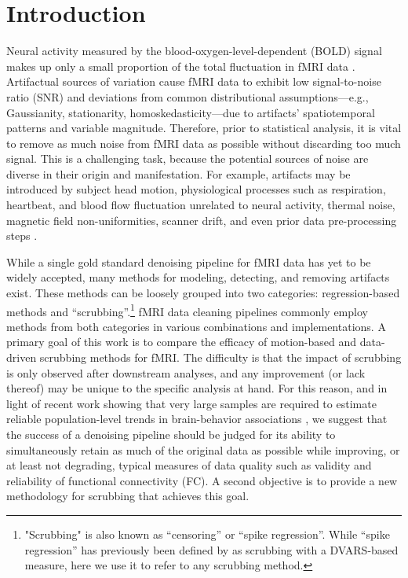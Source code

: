 \documentclass{article}
\begin{document}

\section{Introduction}

Neural activity measured by the blood-oxygen-level-dependent (BOLD) signal makes up only a small proportion of the total fluctuation in fMRI data \citep{lindquistStatisticalAnalysisFMRI2008,bianciardiSourcesFunctionalMagnetic2009}. Artifactual sources of variation cause fMRI data to exhibit low signal-to-noise ratio (SNR) and deviations from common distributional assumptions---e.g., Gaussianity, stationarity, homoskedasticity---due to artifacts' spatiotemporal patterns and variable magnitude. Therefore, prior to statistical analysis, it is vital to remove as much noise from fMRI data as possible without discarding too much signal. This is a challenging task, because the potential sources of noise are diverse in their origin and manifestation. For example, artifacts may be introduced by subject head motion, physiological processes such as respiration, heartbeat, and blood flow fluctuation unrelated to neural activity, thermal noise, magnetic field non-uniformities, scanner drift, and even prior data pre-processing steps \citep{bianciardiSourcesFunctionalMagnetic2009,liuNoiseContributionsFMRI2016,caballero-gaudesMethodsCleaningBOLD2017}.  

While a single gold standard denoising pipeline for fMRI data has yet to be widely accepted, many methods for modeling, detecting, and removing artifacts exist. These methods can be loosely grouped into two categories: regression-based methods and ``scrubbing''.\footnote{"Scrubbing" is also known as ``censoring'' or ``spike regression''. While ``spike regression'' has previously been defined by \cite{satterthwaiteImprovedFrameworkConfound2013} as scrubbing with a DVARS-based measure, here we use it to refer to any scrubbing method.} fMRI data cleaning pipelines commonly employ methods from both categories in various combinations and implementations. A primary goal of this work is to compare the efficacy of motion-based and data-driven scrubbing methods for fMRI. The difficulty is that the impact of scrubbing is only observed after downstream analyses, and any improvement (or lack thereof) may be unique to the specific analysis at hand. For this reason, and in light of recent work showing that very large samples are required to estimate reliable population-level trends in brain-behavior associations \citep{Marek2022}, we suggest that the success of a denoising pipeline should be judged for its ability to simultaneously retain as much of the original data as possible while improving, or at least not degrading, typical measures of data quality such as validity and reliability of functional connectivity (FC). A second objective is to provide a new methodology for scrubbing that achieves this goal. 
\end{document}

